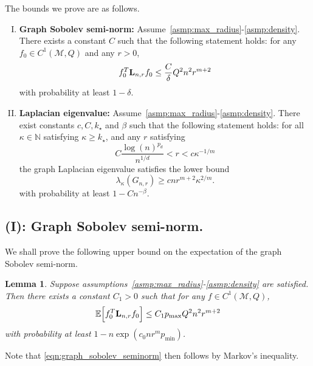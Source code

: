 \documentclass{article}
\newcommand{\1}{\mathbf{1}}
\newcommand{\Lap}{{\bf L}}
\newcommand{\Ebb}{\mathbb{E}}
\newcommand{\mc}[1]{\mathcal{#1}}
\theoremstyle{alden}
\theoremstyle{aldenthm}
\newtheorem{lemma}{Lemma}
\theoremstyle{definition}
\theoremstyle{remark}
\begin{document}
The bounds we prove are as follows.
\begin{enumerate}[(I)]
	\item \textbf{Graph Sobolev semi-norm:} Assume~\ref{asmp:max_radius}-\ref{asmp:density}. There exists a constant $C$ such that the following statement holds: for any $f_0 \in C^1(\mc{M},Q)$ and any $r > 0$,
	\begin{equation}
	\label{eqn:graph_sobolev_seminorm}
	f_0^T \Lap_{n,r} f_0 \leq \frac{C}{\delta}  Q^2 n^2 r^{m + 2}
	\end{equation}
	with probability at least $1 - \delta$.
	\item \textbf{Laplacian eigenvalue:}
	Assume~\ref{asmp:max_radius}-\ref{asmp:density}. There exist constants $c,C,k_{\star}$ and $\beta$ such that the following statement holds: for all $\kappa \in \mathbb{N}$ satisfying $\kappa \geq k_{\star}$, and any $r$ satisfying
	\begin{equation}
	\label{eqn:graph_eigenvalue_1}
	C \frac{\log(n)^{p_d}}{n^{1/d}} < r < c \kappa^{-1/m}
	\end{equation}
	the graph Laplacian eigenvalue satisfies the lower bound
	\begin{equation}
	\label{eqn:graph_eigenvalue_2}
	\lambda_{\kappa}(G_{n,r}) \geq c n r^{m + 2} \kappa^{2/m}.
	\end{equation}
	with probability at least $1 - C n^{-\beta}$.
\end{enumerate}

\subsection{(I): Graph Sobolev semi-norm.}

We shall prove the following upper bound on the expectation of the graph Sobolev semi-norm. 
\begin{lemma}
	\label{lem:expected_graph_sobolev_seminorm_manifold}
	Suppose assumptions~\ref{asmp:max_radius}-\ref{asmp:density} are satisfied. Then there exists a constant $C_1 > 0$ such that for any $f \in C^1(\mc{M}, Q)$,
	\begin{equation}
	\label{eqn:expected_graph_sobolev_seminorm_manifold}
	\Ebb\Bigl[f_0^T \Lap_{n,r} f_0 \Bigr] \leq C_1 p_{\max} Q^2  n^2 r^{m + 2} 
	\end{equation}
	with probability at least $1 - n\exp(c_0 n r^m p_{\min})$. 
\end{lemma}

Note that \eqref{eqn:graph_sobolev_seminorm} then follows by Markov's inequality.
\end{document}
